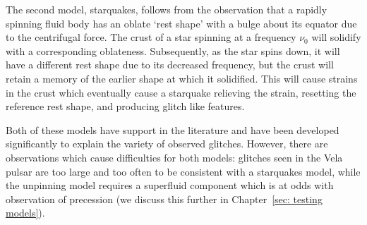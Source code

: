The second model, starquakes, follows from the observation that a rapidly
spinning fluid body has an oblate `rest shape' with a bulge about its equator
due to the centrifugal force. The crust of a star spinning at a frequency $\nu_0$
will solidify with a corresponding oblateness. Subsequently, as the star spins down,
it will have a different rest shape due to its decreased frequency, but the crust
will retain a memory of the earlier shape at which it solidified. This will cause
strains in the crust which eventually cause a starquake relieving the strain,
resetting the reference rest shape, and producing glitch like features.

Both of these models have support in the literature and have been developed
significantly to explain the variety of observed glitches. However, there are
observations which cause difficulties for both models: glitches seen in the
Vela pulsar are too large and too often to be consistent with a starquakes
model, while the unpinning model requires a superfluid component which is at
odds with observation of precession (we discuss this further in
Chapter~\ref{sec: testing models}).


